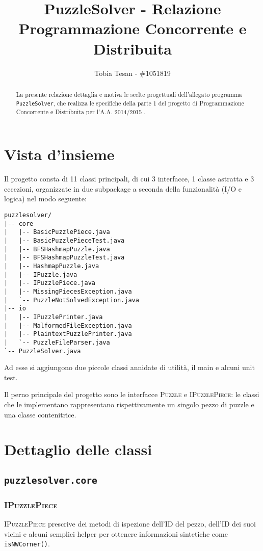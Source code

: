 \documentclass[a4paper]{article}
\title{PuzzleSolver - Relazione Programmazione Concorrente e Distribuita}
\author{Tobia Tesan - \#1051819}
\newcommand{\Classname}[1]{\textsc{#1}}
\newcommand{\Ifacename}[1]{\textsc{#1}}
\newcommand{\Methodname}[1]{\texttt{#1}}
\newcommand{\Pkgname}[1]{\texttt{#1}}
\begin{document}
\maketitle

\begin{abstract}
La presente relazione dettaglia e motiva le scelte progettuali dell'allegato programma \texttt{PuzzleSolver}, che realizza le specifiche della parte 1 del progetto di Programmazione Concorrente e Distribuita per l'A.A. 2014/2015 \cite{prspec}.
\end{abstract}

\tableofcontents

\section{Vista d'insieme}

Il progetto consta di 11 classi principali, di cui 3 interfacce, 1 classe astratta e 3 eccezioni, organizzate in due subpackage a seconda della funzionalit\`a (I/O e logica) nel modo seguente:

\begin{verbatim}
puzzlesolver/
|-- core
|   |-- BasicPuzzlePiece.java
|   |-- BasicPuzzlePieceTest.java
|   |-- BFSHashmapPuzzle.java
|   |-- BFSHashmapPuzzleTest.java
|   |-- HashmapPuzzle.java
|   |-- IPuzzle.java
|   |-- IPuzzlePiece.java
|   |-- MissingPiecesException.java
|   `-- PuzzleNotSolvedException.java
|-- io
|   |-- IPuzzlePrinter.java
|   |-- MalformedFileException.java
|   |-- PlaintextPuzzlePrinter.java
|   `-- PuzzleFileParser.java
`-- PuzzleSolver.java
\end{verbatim}

Ad esse si aggiungono due piccole classi annidate di utilit\`a, il main e alcuni unit test.

Il perno principale del progetto sono le interfacce \Ifacename{Puzzle} e \Ifacename{IPuzzlePiece}: le classi che le implementano rappresentano rispettivamente un singolo pezzo di puzzle e una classe contenitrice.

\section{Dettaglio delle classi}
\subsection{\Pkgname{puzzlesolver.core}}
\subsubsection{\Classname{IPuzzlePiece}}
\Ifacename{IPuzzlePiece} prescrive dei metodi di ispezione dell'ID del pezzo, dell'ID dei suoi vicini e alcuni semplici helper per ottenere informazioni sintetiche come \Methodname{isNWCorner()}.
\end{document}
